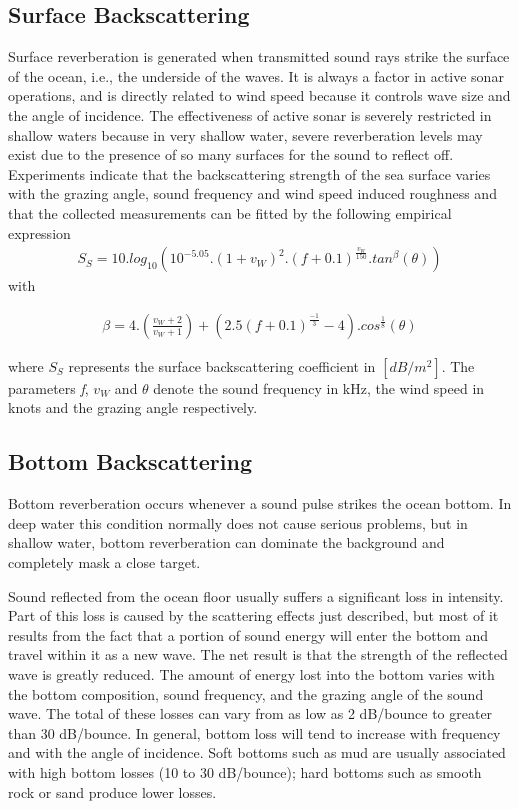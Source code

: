 \subsection{ Surface Backscattering } \label{ Surface Backscattering } 
\noindent Surface reverberation is generated when transmitted sound rays strike the surface of the ocean, i.e., the underside of the waves. It is always a factor in active sonar operations, and is directly related to wind speed because it controls wave size and the angle of incidence. The effectiveness of active sonar is severely restricted in shallow waters because in very shallow water, severe reverberation levels may exist due to the presence of so many surfaces for the sound to reflect off. Experiments indicate that the backscattering strength of the sea surface varies with the grazing angle, sound frequency and wind speed induced roughness and that the collected measurements can be fitted by the following empirical expression
\begin{align}
{S_S}  = 10 . log_{10}( 10^{-5.05}  . ( 1 + {v_W} )^2 . ( \textit{f} + 0.1 )^{\frac{v_W}{150}} . tan^{\beta}(\theta))
\end{align}
\noindent with

\begin{align}
\beta  = 4 . (\frac{v_W + 2}{v_W+ 1}) + ( 2.5 ( f + 0.1 )^{\frac{-1}{3}} - 4 ) . cos^{\frac{1}{8}}(\theta)
\end{align}
 
\noindent where $ {S_S} $ represents the surface backscattering coefficient in $ [dB/m^2] $. The parameters \textit{f}, ${v_W}$  and  $\theta$ denote the sound frequency in kHz, the wind speed in knots and the grazing angle respectively. 

\subsection{ Bottom Backscattering } \label{ Bottom Backscattering } 
\noindent Bottom reverberation occurs whenever a sound pulse strikes the ocean bottom. In deep water this condition normally does not cause serious problems, but in shallow water, bottom reverberation can dominate the background and completely mask a close target. 

\noindent Sound reflected from the ocean floor usually suffers a significant loss in intensity. Part of this loss is caused by the scattering effects just described, but most of it results from the fact that a portion of sound energy will enter the bottom and travel within it as a new wave. The net result is that the strength of the reflected wave is greatly reduced. The amount of energy lost into the bottom varies with the bottom composition, sound frequency, and the grazing angle of the sound wave. The total of these losses can vary from as low as 2 dB/bounce to greater than 30 dB/bounce. In general, bottom loss will tend to increase with frequency and with the angle of incidence. Soft bottoms such as mud are usually associated with high bottom losses (10 to 30 dB/bounce); hard bottoms such as smooth rock or sand produce lower losses.

